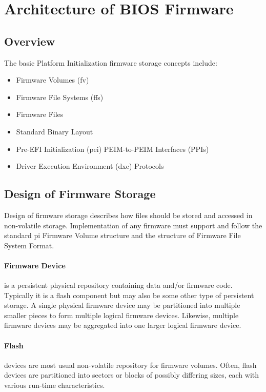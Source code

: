 \section{Architecture of BIOS Firmware}\label{section-architecture}
\subsection{Overview}
The basic Platform Initialization firmware storage concepts include:
\begin{itemize}
	\item Firmware Volumes (\gls{fv})
	\item Firmware File Systems (\gls{ffs})
	\item Firmware Files
	\item Standard Binary Layout
	\item Pre-EFI Initialization (\gls{pei}) PEIM-to-PEIM Interfaces (PPIs)
	\item Driver Execution Environment (\gls{dxe}) Protocols
\end{itemize}

\subsection{Design of Firmware Storage}
Design of firmware storage describes how files should be stored and accessed in non-volatile storage. Implementation of any firmware must support and follow the standard \gls{pi} Firmware Volume structure and the structure of Firmware File System Format.

\paragraph{Firmware Device} is a persistent physical repository containing data and/or firmware code. Typically it is a flash component but may also be some other type of persistent storage. A single physical firmware device may be partitioned into multiple smaller pieces to form multiple logical firmware devices. Likewise, multiple firmware devices may be aggregated into one larger logical firmware device.

\paragraph{Flash} devices are most usual non-volatile repository for firmware volumes. Often, flash devices are partitioned into sectors or blocks of possibly differing sizes, each with various run-time characteristics.

